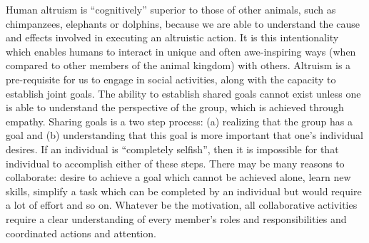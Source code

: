 \documentclass[12pt, letter]{article}
\begin{document}
Human altruism is ``cognitively'' superior to those of other animals, such as chimpanzees, elephants or dolphins, because we are able to understand the cause and effects involved in executing an altruistic action. It is this intentionality which enables humans to interact in unique and often awe-inspiring ways (when compared to other members of the  animal kingdom) with others. Altruism is a pre-requisite for us to engage in social activities, along with the capacity to establish joint goals. The ability to establish shared goals cannot exist unless one is able to understand the perspective of the group, which is achieved through empathy. Sharing goals is a two step process: (a) realizing that the group has a goal and (b) understanding that this goal is more important that one's individual desires. If an individual is ``completely selfish'', then it is impossible for that individual to accomplish either of these steps. There may be many reasons to collaborate: desire to achieve a goal which cannot be achieved alone, learn new skills, simplify a task which can be completed by an individual but would require a lot of effort and so on. Whatever be the motivation, all collaborative activities require a clear understanding of every member's roles and responsibilities and coordinated actions and attention.
 
	

\end{document}
